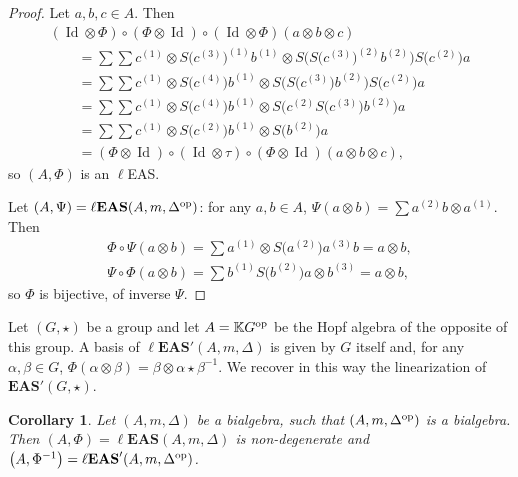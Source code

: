 \documentclass[10pt,a4paper]{amsart}
\numberwithin{equation}{section}
\newtheorem{Corollary}[Theorem]{Corollary}
\newcommand{\eas}{\mathbf{EAS}}
\newcommand{\leas}{\ell\mathbf{EAS}}
\begin{document}
\begin{proof}
Let $a,b,c\in A$. Then
\begin{gather*}
(\operatorname{Id} \otimes \Phi)\circ(\Phi\otimes \operatorname{Id})\circ (\operatorname{Id} \otimes \Phi)(a\otimes b\otimes c)\\
\qquad=\sum \sum c^{(1)}\otimes S\bigl(c^{(3)}\bigr)^{(1)}b^{(1)}\otimes S\bigl(S\bigl(c^{(3)}\bigr)^{(2)}b^{(2)}\bigr)S\bigl(c^{(2)}\bigr)a\\
\qquad=\sum \sum c^{(1)}\otimes S\bigl(c^{(4)}\bigr)b^{(1)}\otimes S\bigl(S\bigl(c^{(3)}\bigr)b^{(2)}\bigr)S\bigl(c^{(2)}\bigr)a\\
\qquad=\sum \sum c^{(1)}\otimes S\bigl(c^{(4)}\bigr)b^{(1)}\otimes S\bigl(c^{(2)}S\bigl(c^{(3)}\bigr)b^{(2)}\bigr)a\\
\qquad=\sum \sum c^{(1)}\otimes S\bigl(c^{(2)}\bigr)b^{(1)}\otimes S\bigl(b^{(2)}\bigr)a\\
\qquad=(\Phi\otimes \operatorname{Id})\circ (\operatorname{Id} \otimes \tau)\circ (\Phi\otimes \operatorname{Id})(a\otimes b\otimes c),
\end{gather*}
so $(A,\Phi)$ is an $\ell$EAS.

Let $(A,\Psi)=\leas(A,m,\Delta^{\rm op})$: for any $a,b\in A$, $\Psi(a\otimes b)=\sum a^{(2)}b\otimes a^{(1)}$. Then
\begin{gather*}
\Phi\circ \Psi(a \otimes b)=\sum a^{(1)}\otimes S\bigl(a^{(2)}\bigr)a^{(3)}b=a\otimes b,\\
\Psi\circ \Phi(a\otimes b)=\sum b^{(1)}S\bigl(b^{(2)}\bigr)a\otimes b^{(3)}=a\otimes b,
\end{gather*}
so $\Phi$ is bijective, of inverse $\Psi$. \end{proof}

\begin{Example}
Let $(G,\star)$ be a group and let $A=\mathbb{K} G^{\rm op}$ be the Hopf algebra of the opposite of this group. A basis of $\leas'(A,m,\Delta)$ is given by $G$ itself and, for any $\alpha,\beta\in G$,
$\Phi(\alpha \otimes \beta)=\beta \otimes \alpha \star \beta^{-1}$.
We recover in this way the linearization of $\eas'(G,\star)$.
\end{Example}

\begin{Corollary}
Let $(A,m,\Delta)$ be a bialgebra, such that $(A,m,\Delta^{\rm op})$ is a bialgebra. Then $(A,\Phi)=\leas(A,m,\Delta)$ is non-degenerate and $\bigl(A,\Phi^{-1}\bigr)=\leas'(A,m,\Delta^{\rm op})$.
\end{Corollary}
\end{document}
